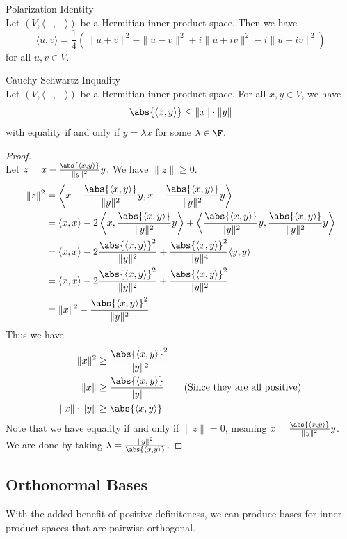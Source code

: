 \documentclass[a4paper]{article}
\begin{document}
\begin{lmm}{Polarization Identity}{}\\
Let $(V,\langle-,-\rangle)$ be a Hermitian inner product space. Then we have $$\langle u,v\rangle=\frac{1}{4}\left(\|u+v\|^2-\|u-v\|^2+i\|u+iv\|^2-i\|u-iv\|^2\right)$$ for all $u,v\in V$. 
\end{lmm}

\begin{prp}{Cauchy-Schwartz Inquality}{}\\
Let $(V,\langle-,-\rangle)$ be a Hermitian inner product space. For all $x,y\in V$, we have $$\abs{\langle x,y\rangle}\leq\|x\|\cdot\|y\|$$ with equality if and only if $y=\lambda x$ for some $\lambda\in\F$. 
\begin{proof}\\
Let $z=x-\frac{\abs{\langle x,y\rangle}}{\|y\|^2}y$. We have $\|z\|\geq0$. 
\begin{align*}
\|z\|^2&=\left\langle x-\frac{\abs{\langle x,y\rangle}}{\|y\|^2}y,x-\frac{\abs{\langle x,y\rangle}}{\|y\|^2}y\right\rangle\\
&=\langle x,x\rangle-2\left\langle x,\frac{\abs{\langle x,y\rangle}}{\|y\|^2}y\right\rangle+\left\langle \frac{\abs{\langle x,y\rangle}}{\|y\|^2}y,\frac{\abs{\langle x,y\rangle}}{\|y\|^2}y\right\rangle\\
&=\langle x,x\rangle-2\frac{\abs{\langle x,y\rangle}^2}{\|y\|^2}+\frac{\abs{\langle x,y\rangle}^2}{\|y\|^4}\langle y,y\rangle\\
&=\langle x,x\rangle-2\frac{\abs{\langle x,y\rangle}^2}{\|y\|^2}+\frac{\abs{\langle x,y\rangle}^2}{\|y\|^2}\\
&=\|x\|^2-\frac{\abs{\langle x,y\rangle}^2}{\|y\|^2}\\
\end{align*}
Thus we have
\begin{align*}
\|x\|^2&\geq\frac{\abs{\langle x,y\rangle}^2}{\|y\|^2}\\
\|x\|&\geq\frac{\abs{\langle x,y\rangle}}{\|y\|}\tag{Since they are all positive}\\
\|x\|\cdot\|y\|&\geq\abs{\langle x,y\rangle}
\end{align*}
Note that we have equality if and only if $\|z\|=0$, meaning $x=\frac{\abs{\langle x,y\rangle}}{\|y\|^2}y$. We are done by taking $\lambda=\frac{\|y\|^2}{\abs{\langle x,y\rangle}}$. 
\end{proof}
\end{prp}

\subsection{Orthonormal Bases}
With the added benefit of positive definiteness, we can produce bases for inner product spaces that are pairwise orthogonal. 
\end{document}

